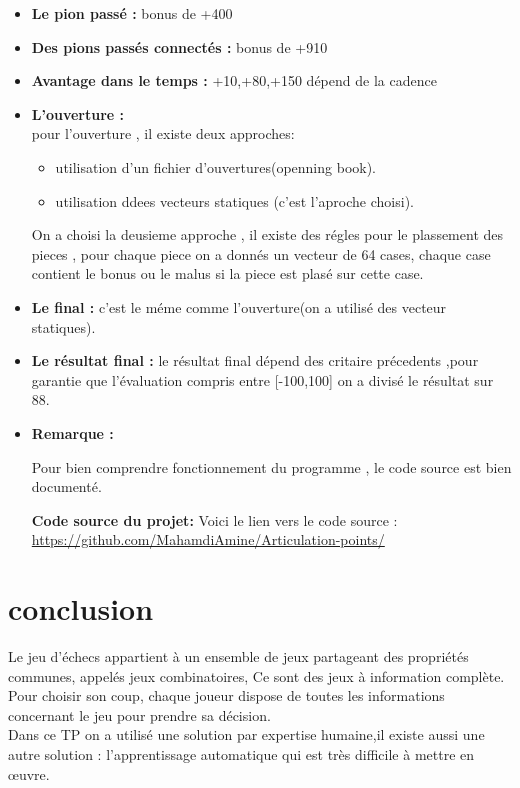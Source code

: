 \documentclass[12pt]{report}
\begin{document}
\begin{itemize}
	\item \textbf{Le pion passé :} bonus de +400\\
	\item \textbf{Des pions passés connectés :} bonus de +910 \\
	\item \textbf{Avantage dans le temps :} {+10,+80,+150} dépend de la cadence\\
	\item \textbf{L'ouverture :} \\
	pour l'ouverture , il existe deux approches:
	\begin{itemize}
		\item utilisation d'un fichier d'ouvertures(openning book).
		\item utilisation ddees vecteurs statiques (c'est l'aproche choisi).
	\end{itemize}
	On a choisi la deusieme approche , il existe des régles pour le plassement des pieces , pour chaque piece on a donnés un vecteur de 64 cases, chaque case contient le bonus ou le malus si la piece est plasé sur cette case.
	\item \textbf{Le final :} c'est le méme comme l'ouverture(on a utilisé des vecteur statiques). \\  
	\item \textbf{Le résultat final :} le résultat final dépend des critaire précedents ,pour garantie que l'évaluation compris entre [-100,100] on a divisé le résultat sur 88.
	 \item \textbf{Remarque :} 
	\par{}
	Pour bien comprendre fonctionnement du programme  , le code source est bien documenté.
	\par{}
	\textbf{Code source du projet: } 
	\newline
	Voici  le lien vers le code source :
	\newline
	\href{https://github.com/MahamdiAmine/Articulation-points}{https://github.com/MahamdiAmine/Articulation-points/}
\end{itemize}	
\chapter{conclusion}
Le jeu d’échecs appartient à un ensemble de jeux partageant des propriétés communes,
appelés jeux combinatoires, Ce sont des jeux à information complète. \\

Pour choisir son coup, chaque joueur dispose de toutes les informations concernant le jeu pour prendre sa décision.
\\

Dans ce TP on a utilisé une solution par expertise humaine,il existe aussi une autre solution : l'apprentissage automatique qui est très difficile à mettre en œuvre.
\\
\end{document}
